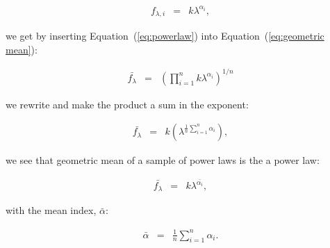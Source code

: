\documentclass{aa}    %
\newcommand{\Eq}[1]{Equation~(\ref{eq:#1})}
\newcommand{\eq}[1]{\Eq{#1}}
\newcommand{\eqlabel}[1]{\label{eq:#1}}
\begin{document}
\begin{eqnarray}\eqlabel{powerlaw}
f_{\lambda, i} &=&  k \lambda ^{\alpha_{i}},
\end{eqnarray}

 we get by inserting \eq{powerlaw} into \eq{geometric mean}:
 
 \begin{eqnarray}\eqlabel{deriv1}
 \bar{f_{\lambda}} &=&  \left( \prod_{i=1}^n k \lambda ^{\alpha_{i}}\right) ^{1/n}
 \end{eqnarray}

we rewrite and make the product a sum in the exponent:

 \begin{eqnarray}\eqlabel{deriv2}
 \bar{f_{\lambda}} &=&  k \left( \lambda ^{ \frac{1}{n} \sum_{i=1}^n \alpha_{i}  }\right) ,
 \end{eqnarray}

we see that geometric mean of a sample of power laws is the a power law:

 \begin{eqnarray}\eqlabel{deriv3}
 \bar{f_{\lambda}} &=&  k \lambda ^{ \bar{\alpha_{i} }},
 \end{eqnarray}

with the mean index, $\bar{\alpha}$:

 \begin{eqnarray}\eqlabel{mean}
 \bar{\alpha} &=&  \frac{1}{n} \sum_{i=1}^n \alpha_{i} .
 \end{eqnarray}
\end{document}
